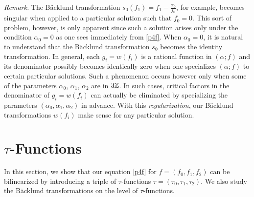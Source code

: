 \par\medskip \noindent
{\em Remark.}\quad
The B\"acklund transformation 
$s_0(f_1)=f_1-\frac{\alpha_0}{f_0}$, for example, becomes singular
when applied to a particular solution such that $f_0=0$. 
This sort of problem, however, is only apparent since such a solution 
arises only under the condition $\alpha_0=0$ as one sees immediately 
from \eqref{p4f}.  
When $\alpha_0=0$, it is natural to understand 
that the B\"acklund transformation $s_0$ 
becomes the identity transformation.   
In general, 
each $g_i=w(f_i)$ is a rational function in $(\alpha; f)$ and 
its denominator possibly becomes identically zero when 
one specializes $(\alpha;f)$ to certain particular solutions.  
Such a phenomenon occurs however only when some of 
the parameters $\alpha_0$, $\alpha_1$, $\alpha_2$ are 
in $3{\Bbb Z}$. 
In such cases, critical factors in the denominator of 
$g_i=w(f_i)$ can actually be eliminated by specializing the parameters 
$(\alpha_0,\alpha_1,\alpha_2)$ in advance.  
With this {\em regularization}, 
our B\"acklund transformations $w(f_i)$ make sense for any particular 
solution. 
\par\medskip
\section{$\tau$-Functions}
In this section, we show that our equation \eqref{p4f} for $f=(f_0,f_1,f_2)$ 
can be bilinearized by introducing a triple of $\tau$-functions 
$\tau=(\tau_0,\tau_1,\tau_2)$. 
We also study the B\"acklund transformations on the level of $\tau$-functions.

